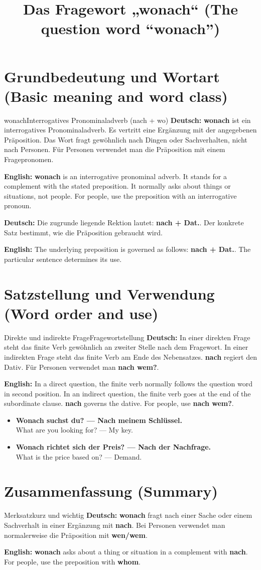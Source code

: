 \documentclass[a4paper,11pt]{article}
\title{Das Fragewort „wonach“ (The question word “wonach”)}
\date{}
\newcommand{\GermanText}[1]{\textbf{Deutsch: }#1\par}
\newcommand{\EnglishText}[1]{{\small\color{SoftGray}\textbf{English: }#1\par}}
\newcommand{\ExampleItem}[2]{\item \textbf{#1}\\{\small\color{SoftGray}#2}}
\begin{document}
\maketitle
\tableofcontents
\newpage
\section{Grundbedeutung und Wortart (Basic meaning and word class)}
\begin{grammarentry}{wonach}{Interrogatives Pronominaladverb (nach + wo)}
\GermanText{\textbf{wonach} ist ein interrogatives Pronominaladverb. Es vertritt eine Ergänzung mit der angegebenen Präposition. Das Wort fragt gewöhnlich nach Dingen oder Sachverhalten, nicht nach Personen. Für Personen verwendet man die Präposition mit einem Fragepronomen.}
\EnglishText{\textbf{wonach} is an interrogative pronominal adverb. It stands for a complement with the stated preposition. It normally asks about things or situations, not people. For people, use the preposition with an interrogative pronoun.}
\GermanText{Die zugrunde liegende Rektion lautet: \textbf{nach + Dat.}. Der konkrete Satz bestimmt, wie die Präposition gebraucht wird.}
\EnglishText{The underlying preposition is governed as follows: \textbf{nach + Dat.}. The particular sentence determines its use.}
\end{grammarentry}
\section{Satzstellung und Verwendung (Word order and use)}
\begin{grammarentry}{Direkte und indirekte Frage}{Fragewortstellung}
\GermanText{In einer direkten Frage steht das finite Verb gewöhnlich an zweiter Stelle nach dem Fragewort. In einer indirekten Frage steht das finite Verb am Ende des Nebensatzes. \textbf{nach} regiert den Dativ. Für Personen verwendet man \textbf{nach wem?}.}
\EnglishText{In a direct question, the finite verb normally follows the question word in second position. In an indirect question, the finite verb goes at the end of the subordinate clause. \textbf{nach} governs the dative. For people, use \textbf{nach wem?}.}
\end{grammarentry}
\begin{exbox}\begin{itemize}
\ExampleItem{Wonach suchst du? — Nach meinem Schlüssel.}{What are you looking for? — My key.}
\ExampleItem{Wonach richtet sich der Preis? — Nach der Nachfrage.}{What is the price based on? — Demand.}
\end{itemize}\end{exbox}
\section{Zusammenfassung (Summary)}
\begin{grammarentry}{Merksatz}{kurz und wichtig}
\GermanText{\textbf{wonach} fragt nach einer Sache oder einem Sachverhalt in einer Ergänzung mit \textbf{nach}. Bei Personen verwendet man normalerweise die Präposition mit \textbf{wen/wem}.}
\EnglishText{\textbf{wonach} asks about a thing or situation in a complement with \textbf{nach}. For people, use the preposition with \textbf{whom}.}
\end{grammarentry}
\end{document}
